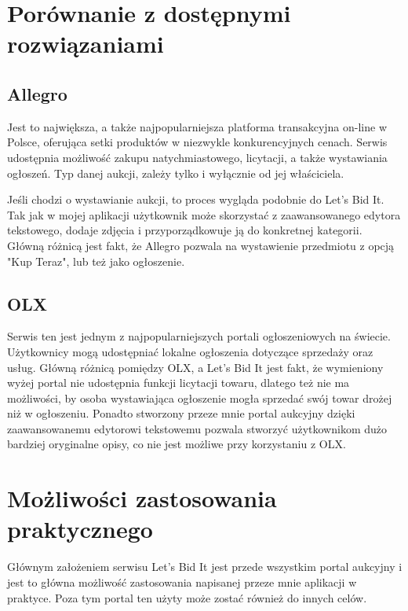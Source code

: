 \documentclass[brudnopis]{xmgr}
\begin{document}
\section{Porównanie z dostępnymi rozwiązaniami}

\subsection{Allegro} 

Jest to największa, a także najpopularniejsza platforma transakcyjna on-line w Polsce, oferująca setki produktów w niezwykle konkurencyjnych cenach. Serwis udostępnia możliwość zakupu natychmiastowego, licytacji, a także wystawiania ogłoszeń. Typ danej aukcji, zależy tylko i wyłącznie od jej właściciela.

Jeśli chodzi o wystawianie aukcji, to proces wygląda podobnie do Let's Bid It. Tak jak w mojej aplikacji użytkownik może skorzystać z zaawansowanego edytora tekstowego, dodaje zdjęcia i przyporządkowuje ją do konkretnej kategorii. Główną różnicą jest fakt, że Allegro pozwala na wystawienie przedmiotu z opcją "Kup Teraz", lub też jako ogłoszenie.

\subsection{OLX}  

Serwis ten jest jednym z najpopularniejszych portali ogłoszeniowych na świecie. Użytkownicy
mogą udostępniać lokalne ogłoszenia dotyczące sprzedaży oraz usług. Główną różnicą pomiędzy OLX, a Let's Bid It jest fakt,
że wymieniony wyżej portal nie udostępnia funkcji licytacji towaru, dlatego też nie ma możliwości, by osoba wystawiająca ogłoszenie mogła sprzedać swój towar drożej niż w ogłoszeniu. Ponadto stworzony przeze mnie portal aukcyjny dzięki zaawansowanemu edytorowi tekstowemu pozwala stworzyć użytkownikom dużo bardziej oryginalne opisy, co nie jest możliwe przy korzystaniu z OLX.

\section{Możliwości zastosowania praktycznego}
Głównym założeniem serwisu Let's Bid It jest przede wszystkim portal aukcyjny i jest to główna możliwość zastosowania napisanej przeze mnie aplikacji w praktyce. Poza tym portal ten użyty może zostać również do innych celów.
\end{document}
